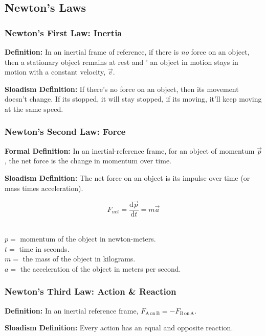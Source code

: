 \subsection{Newton's Laws}
\subsubsection{Newton's First Law: Inertia}
\textbf{Definition:} In an inertial frame of reference, if there is \textit{no} force on an object, then a stationary object remains at rest and '
an object in motion stays in motion with a constant velocity, $\vec{v}$.

\noindent \textbf{Sloadism Definition:} If there's no force on an object, then its movement doesn't change. If its stopped, it will stay stopped, if 
its moving, it'll keep moving at the same speed.

\subsubsection{Newton's Second Law: Force}
\textbf{Formal Definition:} In an inertial-reference frame, for an object of momentum $\vec{p}$, the net force is the change in momentum over time.

\noindent \textbf{Sloadism Definition:} The net force on an object is its impulse over time (or mass times acceleration).

\begin{equation}
    F_{net} = \frac{\mathrm{d}\vec{p}}{\mathrm{d}t} = m\vec{a}
\end{equation} 

 \\
$p = $ momentum of the object in newton-meters. \\
$t = $ time in seconds. \\
$m = $ the mass of the object in kilograms. \\
$a = $ the acceleration of the object in meters per second. \\

\subsubsection{Newton's Third Law: Action \& Reaction}
\textbf{Definition:} In an inertial reference frame, $F_{\mathrm{A \, on \, B}} = -F_{\mathrm{B \, on \, A}}$.

\noindent \textbf{Sloadism Definition:} Every action has an equal and opposite reaction.

